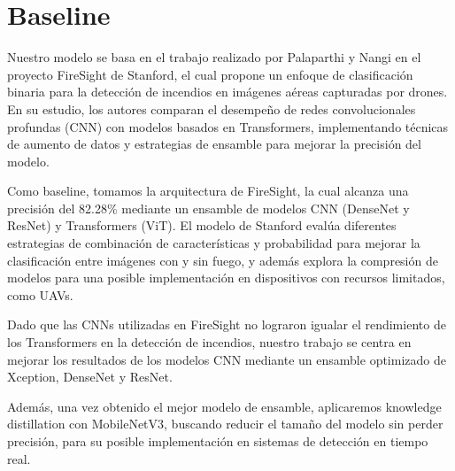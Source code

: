 \section{Baseline}

Nuestro modelo se basa en el trabajo realizado por Palaparthi y Nangi en el 
proyecto FireSight de Stanford, el cual propone un enfoque de clasificación
binaria para la detección de incendios en imágenes aéreas capturadas por drones.
En su estudio, los autores comparan el desempeño de redes convolucionales profundas (CNN) 
con modelos basados en Transformers, implementando técnicas de aumento de datos y 
estrategias de ensamble para mejorar la precisión del modelo.

Como baseline, tomamos la arquitectura de FireSight, la cual alcanza una 
precisión del 82.28\% mediante un ensamble de modelos CNN (DenseNet y ResNet) 
y Transformers (ViT). El modelo de Stanford evalúa diferentes estrategias de
combinación de características y probabilidad para mejorar la clasificación entre
imágenes con y sin fuego, y además explora la compresión de modelos para una posible
implementación en dispositivos con recursos limitados, como UAVs.

Dado que las CNNs utilizadas en FireSight no lograron igualar el 
rendimiento de los Transformers en la detección de incendios,
nuestro trabajo se centra en mejorar los resultados de los modelos
CNN mediante un ensamble optimizado de Xception, DenseNet y ResNet.

Además, una vez obtenido el mejor modelo de ensamble, aplicaremos
knowledge distillation con MobileNetV3, buscando reducir el tamaño del
modelo sin perder precisión, para su posible implementación en
sistemas de detección en tiempo real.